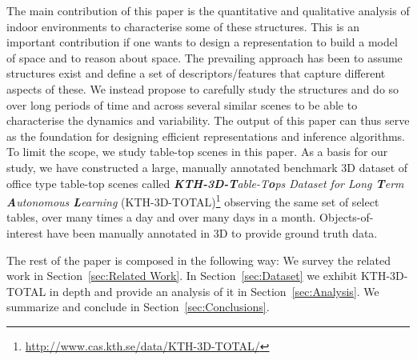 \documentclass[letterpaper, 10 pt, conference]{ieeeconf}  %
\begin{document}
The main contribution of this paper is the quantitative and qualitative analysis of
indoor environments to characterise some of these structures. This is
an important contribution if one wants to design a representation to
build a model of space and to reason about space.  The prevailing
approach has been to assume structures exist and define a set of
descriptors/features that capture different aspects of these. We
instead propose to carefully study the structures and do so over long
periods of time and across several similar scenes to be able to characterise the
dynamics and variability. The output of this paper can thus serve as
the foundation for designing efficient representations and inference
algorithms. To limit the scope, we study table-top scenes in this
paper. As a basis for our study, we have constructed a large, manually annotated 
benchmark 3D dataset of office type table-top scenes called \textit{\textbf{KTH-3D-T}able-T\textbf{o}ps Dataset for Long \textbf{T}erm
  \textbf{A}utonomous \textbf{L}earning} (KTH-3D-TOTAL)\footnote{\url{http://www.cas.kth.se/data/KTH-3D-TOTAL/}} observing
the same set of select tables, over many times a day and over many
days in a month. Objects-of-interest have been manually annotated in
3D to provide ground truth data.

The rest of the paper is composed in the following way: We survey the related work in Section~\ref{sec:Related Work}. In Section~\ref{sec:Dataset} we exhibit KTH-3D-TOTAL in depth and provide an 
analysis of it in Section~\ref{sec:Analysis}. We summarize and conclude in Section~\ref{sec:Conclusions}.


\end{document}
